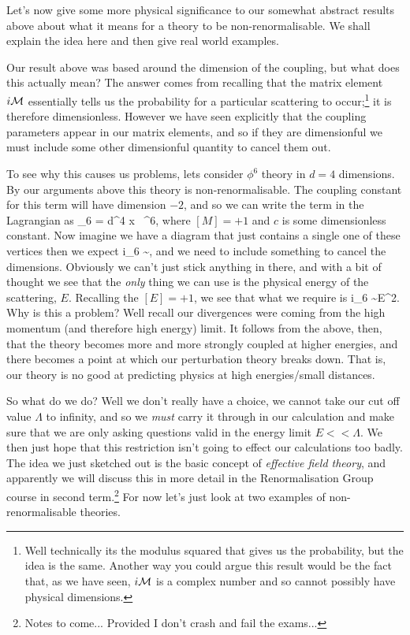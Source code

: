 Let's now give some more physical significance to our somewhat abstract results above about what it means for a theory to be non-renormalisable. We shall explain the idea here and then give real world examples. 

Our result above was based around the dimension of the coupling, but what does this actually mean? The answer comes from recalling that the matrix element $i\mathcal{M}$ essentially tells us the probability for a particular scattering to occur;\footnote{Well technically its the modulus squared that gives us the probability, but the idea is the same. Another way you could argue this result would be the fact that, as we have seen, $i\mathcal{M}$ is a complex number and so cannot possibly have physical dimensions.} it is therefore dimensionless. However we have seen explicitly that the coupling parameters appear in our matrix elements, and so if they are dimensionful we must include some other dimensionful quantity to cancel them out. 

To see why this causes us problems, lets consider $\phi^6$ theory in $d=4$ dimensions. By our arguments above this theory is non-renormalisable. The coupling constant for this term will have dimension $-2$, and so we can write the term in the Lagrangian as
\bse 
    \cL_6 = \int d^4 x \,  \phi^6,
\ese 
where $[M]=+1$ and $c$ is some dimensionless constant. Now imagine we have a diagram that just contains a single one of these vertices then we expect 
\bse 
    i\cM_6 \sim {},
\ese 
and we need to include something to cancel the dimensions. Obviously we can't just stick anything in there, and with a bit of thought we see that the \textit{only} thing we can use is the physical energy of the scattering, $E$. Recalling the $[E]=+1$, we see that what we require is 
\bse 
    i\cM_6 \sim {}E^2.
\ese
Why is this a problem? Well recall our divergences were coming from the high momentum (and therefore high energy) limit. It follows from the above, then, that the theory becomes more and more strongly coupled at higher energies, and there becomes a point at which our perturbation theory breaks down. That is, our theory is no good at predicting physics at high energies/small distances. 

So what do we do? Well we don't really have a choice, we cannot take our cut off value $\Lambda$ to infinity, and so we \textit{must} carry it through in our calculation and make sure that we are only asking questions valid in the energy limit $E << \Lambda$. We then just hope that this restriction isn't going to effect our calculations too badly. The idea we just sketched out is the basic concept of \textit{effective field theory}, and apparently we will discuss this in more detail in the Renormalisation Group course in second term.\footnote{Notes to come... Provided I don't crash and fail the exams...} For now let's just look at two examples of non-renormalisable theories.

